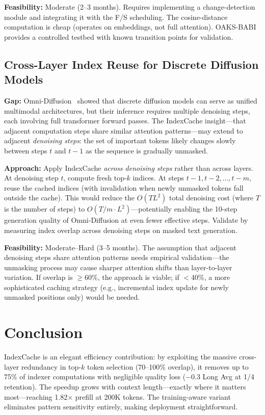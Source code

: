 \documentclass[11pt]{article}
\begin{document}
\textbf{Feasibility:} Moderate (2--3 months). Requires implementing a change-detection module and integrating it with the F/S scheduling. The cosine-distance computation is cheap (operates on embeddings, not full attention). OAKS-BABI provides a controlled testbed with known transition points for validation.

\subsection{Cross-Layer Index Reuse for Discrete Diffusion Models}

\textbf{Gap:} Omni-Diffusion~\citep{li2026omnidiffusion} showed that discrete diffusion models can serve as unified multimodal architectures, but their inference requires multiple denoising steps, each involving full transformer forward passes. The IndexCache insight---that adjacent computation steps share similar attention patterns---may extend to adjacent \emph{denoising steps}: the set of important tokens likely changes slowly between steps $t$ and $t{-}1$ as the sequence is gradually unmasked.

\textbf{Approach:} Apply IndexCache \emph{across denoising steps} rather than across layers. At denoising step $t$, compute fresh top-$k$ indices. At steps $t{-}1, t{-}2, \ldots, t{-}m$, reuse the cached indices (with invalidation when newly unmasked tokens fall outside the cache). This would reduce the $O(TL^2)$ total denoising cost (where $T$ is the number of steps) to $O(T/m \cdot L^2)$---potentially enabling the 10-step generation quality of Omni-Diffusion at even fewer effective steps. Validate by measuring index overlap across denoising steps on masked text generation.

\textbf{Feasibility:} Moderate--Hard (3--5 months). The assumption that adjacent denoising steps share attention patterns needs empirical validation---the unmasking process may cause sharper attention shifts than layer-to-layer variation. If overlap is $\geq$60\%, the approach is viable; if $<$40\%, a more sophisticated caching strategy (e.g., incremental index update for newly unmasked positions only) would be needed.

\section{Conclusion}

IndexCache is an elegant efficiency contribution: by exploiting the massive cross-layer redundancy in top-$k$ token selection (70--100\% overlap), it removes up to 75\% of indexer computations with negligible quality loss ($-$0.3 Long Avg at 1/4 retention). The speedup grows with context length---exactly where it matters most---reaching 1.82$\times$ prefill at 200K tokens. The training-aware variant eliminates pattern sensitivity entirely, making deployment straightforward.
\end{document}
